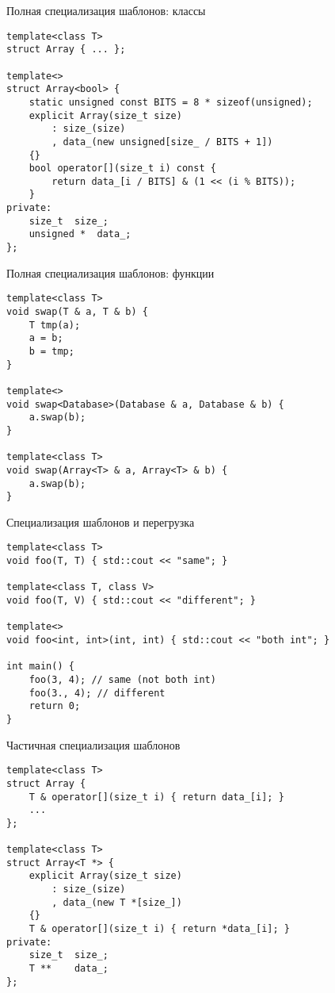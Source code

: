 \documentclass{beamer}
\begin{document}
\begin{frame}[fragile]{Полная специализация шаблонов: классы}
\small
    \begin{lstlisting}
template<class T>
struct Array { ... };

template<>
struct Array<bool> {
    static unsigned const BITS = 8 * sizeof(unsigned);
    explicit Array(size_t size)
        : size_(size)
        , data_(new unsigned[size_ / BITS + 1])
    {}
    bool operator[](size_t i) const {
        return data_[i / BITS] & (1 << (i % BITS)); 
    }
private:
    size_t  size_;
    unsigned *  data_;
};
    \end{lstlisting}
\end{frame}

\begin{frame}[fragile]{Полная специализация шаблонов: функции}
\small
    \begin{lstlisting}
template<class T>
void swap(T & a, T & b) {
    T tmp(a);
    a = b;
    b = tmp;
}

template<>
void swap<Database>(Database & a, Database & b) {
    a.swap(b);
}

template<class T>
void swap(Array<T> & a, Array<T> & b) {
    a.swap(b);
}
    \end{lstlisting}
\end{frame}

\begin{frame}[fragile]{Специализация шаблонов и перегрузка}
\small
    \begin{lstlisting}
template<class T>
void foo(T, T) { std::cout << "same"; }

template<class T, class V>
void foo(T, V) { std::cout << "different"; }

template<>
void foo<int, int>(int, int) { std::cout << "both int"; } 

int main() {
    foo(3, 4); // same (not both int)
    foo(3., 4); // different
    return 0;    
}
    \end{lstlisting}
\end{frame}

\begin{frame}[fragile]{Частичная специализация шаблонов}
\small
    \begin{lstlisting}
template<class T>
struct Array {
    T & operator[](size_t i) { return data_[i]; }
    ...
};

template<class T>
struct Array<T *> {
    explicit Array(size_t size)
        : size_(size)
        , data_(new T *[size_])
    {}
    T & operator[](size_t i) { return *data_[i]; }
private:
    size_t  size_;
    T **    data_;
};
    \end{lstlisting}
\end{frame}
\end{document}
